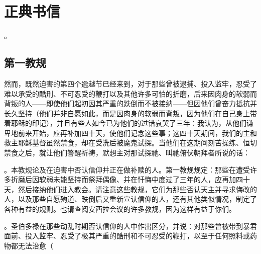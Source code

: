 
\chapter{正典书信}


\par

。\par


\section{第一教规}

然而，既然迫害的第四个逾越节已经来到，对于那些曾被逮捕、投入监牢，忍受了难以承受的酷刑、不可忍受的鞭打以及其他许多可怕的折磨，后来因肉身的软弱而背叛的人——即使他们起初因其严重的跌倒而不被接纳——但因他们曾奋力抵抗并长久坚持（他们并非自愿如此，而是因肉身的软弱而背叛，因为他们在自己身上带着耶稣的印记），并且有些人如今已为他们的过错哀哭了三年：我认为，从他们谦卑地前来开始，应再补加四十天，使他们记念这些事；这四十天期间，我们的主和救主耶稣基督虽然禁食，却在受洗后被魔鬼试探。当他们在这期间刻苦操练、恒切禁食之后，就让他们警醒祈祷，默想主对那试探祂、叫祂俯伏朝拜者所说的话： \par

。本教规论及在迫害中否认信仰并正在做补赎的人。第一教规规定：那些在遭受许多折磨后因软弱未能坚持而祭拜偶像、并在忏悔中度过了三年的人，应再加四十天，然后接纳他们进入教会。请注意这些教规，它们为那些否认天主并寻求悔改的人，以及那些自愿殉道、跌倒后又重新宣认信仰的人，还有其他类似情况，制定了各种有益的规则。也请查阅安西拉会议的许多教规，因为这样有益于你们。\par

。圣伯多禄在那些动乱时期否认信仰的人中作出区分，并说：对那些曾被带到暴君面前、投入监牢、忍受了极其严重的酷刑和不可忍受的鞭打，以至于任何照料或药物都无法治愈（\par

